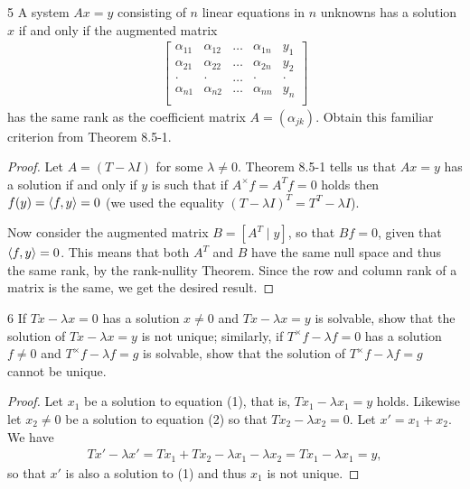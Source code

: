 \begin{exercise}{5}
A system $Ax = y$ consisting of $n$ linear equations in $n$ unknowns has a solution $x$ if and only if the augmented matrix 
\begin{align*}
    \begin{bmatrix}
        \alpha_{1 1} & \alpha_{1 2} & \dots & \alpha_{1 n} & y_1\\
        \alpha_{2 1} & \alpha_{2 2} & \dots & \alpha_{2 n} & y_2\\
        \cdot        & \cdot        & \dots & \cdot        & \cdot\\
        \alpha_{n 1} & \alpha_{n 2} & \dots & \alpha_{n n} & y_n\\
    \end{bmatrix}
\end{align*}
has the same rank as the coefficient matrix $A = (\alpha_{jk})$.
Obtain this familiar criterion from Theorem 8.5-1.
\end{exercise}
\begin{proof}
Let $A = (T - \lambda I)$ for some $\lambda \neq 0$.
Theorem 8.5-1 tells us that $Ax = y$ has a solution if and only if $y$ is such that if $A^\times f = A^T f = 0$ holds then $f(y) = \langle f, y\rangle = 0$ (we used the equality $(T - \lambda I)^T = T^T - \lambda I$).

Now consider the augmented matrix $B = [A^T \mid y]$, so that $B f = 0$, given that $\langle f, y\rangle = 0$.
This means that both $A^T$ and $B$ have the same null space and thus the same rank, by the rank-nullity Theorem. 
Since the row and column rank of a matrix is the same, we get the desired result.
\end{proof} 

\begin{exercise}{6}
If $Tx - \lambda x = 0$ has a solution $x \neq 0$ and $T x - \lambda x = y$ is solvable, show that the solution of $T x - \lambda x = y$ is not unique;
similarly, if $T^\times f - \lambda f = 0$ has a solution $f \neq 0$ and $T^\times f - \lambda f = g$ is solvable, show that the solution of $T^\times f - \lambda f = g$ cannot be unique.
\end{exercise}
\begin{proof}
Let $x_1$ be a solution to equation (1), that is, $T x_1 - \lambda x_1 = y$ holds.
Likewise let $x_2 \neq 0$ be a solution to equation (2) so that $T x_2 - \lambda x_2 = 0$.
Let $x' = x_1 + x_2$.
We have 
\begin{align*}
    Tx' - \lambda x'
    = T x_1 + T x_2 - \lambda x_1 - \lambda x_2
    = T x_1 - \lambda x_1 = y,
\end{align*}
so that $x'$ is also a solution to (1) and thus $x_1$ is not unique.
\end{proof} 

